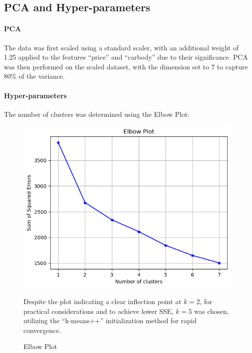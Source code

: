 \documentclass{article}
\begin{document}
\subsection{PCA and Hyper-parameters}
\paragraph{PCA}
The data was first scaled using a standard scaler, with an additional weight of 1.25 applied to the features ``price'' and ``carbody'' due to their significance.
PCA was then performed on the scaled dataset, with the dimension set to 7 to capture 80\% of the variance.

\paragraph{Hyper-parameters}
The number of clusters was determined using the Elbow Plot:
\begin{figure}[H]
    \centering
    \begin{minipage}{0.3\textwidth}
        \centering
        \includegraphics[width=\textwidth]{image/paper/elbow.png}
        \caption{Elbow Plot}
        \label{elbow}
    \end{minipage}\hfill
    \begin{minipage}{0.6\textwidth}
        \small
        Despite the plot indicating a clear inflection point at \( k=2 \), for practical considerations and to achieve lower SSE, \( k=5 \) was chosen, utilizing the ``k-means++'' initialization method for rapid convergence.
    \end{minipage}
\end{figure}
\end{document}
